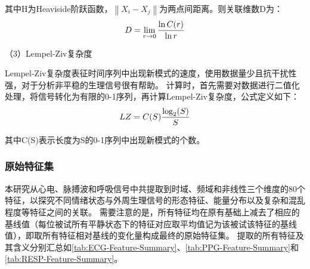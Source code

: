 其中H为Heaviside阶跃函数，${\left\|X_{i}-X_{j}\right\|}$为两点间距离。则关联维数D为：
\vspace{-1ex}
\begin{equation}
    \label{equ:K-value}
    D=\lim _{r \rightarrow 0} \frac{\ln C(r)}{\ln r}
    \vspace{-1ex}
\end{equation}

（3）Lempel-Ziv复杂度

Lempel-Ziv复杂度表征时间序列中出现新模式的速度\cite{陈东伟2014情感识别中脑电信号}，使用数据量少且抗干扰性强，对于分析非平稳的生理信号很有帮助。
计算时，首先需要对数据进行二值化处理，将信号转化为有限的0-1序列，再计算Lempel-Ziv复杂度，公式定义如下：
\vspace{-1ex}
\begin{equation}
    \label{equ:K-value}
    L Z=C(S) \frac{\log _{2}(S)}{S}
    \vspace{-1ex}
\end{equation}

其中C(S)表示长度为S的0-1序列中出现新模式的个数。

\subsubsection{原始特征集}
本研究从心电、脉搏波和呼吸信号中共提取到时域、频域和非线性三个维度的80个特征，以探究不同情绪状态与外周生理信号的形态特征、能量分布以及复杂和混乱程度等特征之间的关联。
需要注意的是，所有特征均在原有基础上减去了相应的基线值（每位被试所有平静状态下的特征对应取平均值记为该被试该特征的基线值），即取所有特征相对基线的变化量构成最终的原始特征集。
提取的所有特征及其含义分别汇总如\autoref{tab:ECG-Feature-Summary}、\autoref{tab:PPG-Feature-Summary}和\autoref{tab:RESP-Feature-Summary}。


